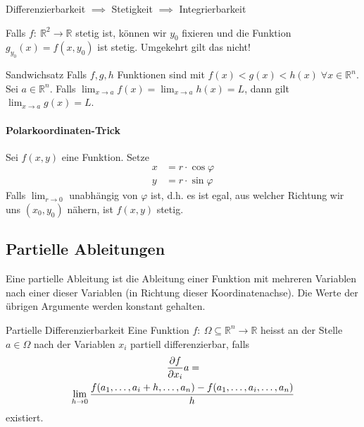 \documentclass[a4paper,10pt]{article}
\def\R{\mathbb{R}}
\begin{document}
\begin{subbox}{}
    Differenzierbarkeit \( \implies \) Stetigkeit \( \implies \) Integrierbarkeit
\end{subbox}

Falls \( f: \: \R^2 \to \R \) stetig ist, können wir \( y_0 \) fixieren und die Funktion \( g_{y_0}(x) = f(x, y_0) \) ist stetig. Umgekehrt gilt das nicht!

\begin{mainbox}{Sandwichsatz}
    Falls \( f, g, h \) Funktionen sind mit \( f(x) < g(x) < h(x) \; \forall x \in \R^n \). Sei \( a \in \R^n \). Falls \( \lim_{x \to a} f(x) = \lim_{x \to a} h(x) = L \), dann gilt \( \lim_{x \to a} g(x) = L \).
\end{mainbox}

\paragraph{Polarkoordinaten-Trick}
Sei \( f(x, y) \) eine Funktion. Setze \begin{align*}
    x &= r \cdot \cos \varphi \\
    y &= r \cdot \sin \varphi
\end{align*}
Falls \( \lim_{r \to 0} \) unabhängig von \( \varphi \) ist, d.h. es ist egal, aus welcher Richtung wir uns \( (x_0, y_0) \) nähern, ist \( f(x, y) \) stetig.


\subsection{Partielle Ableitungen}

\begin{mainbox}{}
    Eine partielle Ableitung ist die Ableitung einer Funktion mit mehreren Variablen nach einer dieser Variablen (in Richtung dieser Koordinatenachse). Die Werte der übrigen Argumente werden konstant gehalten.
\end{mainbox}

\begin{mainbox}{Partielle Differenzierbarkeit}
    Eine Funktion \( f: \: \Omega \subseteq \R^n \to \R \) heisst an der Stelle \( a \in \Omega \) nach der Variablen \( x_i \) partiell differenzierbar, falls \begin{multline*}
        \pdv{f}{x_i} a = \\
        \lim_{h \to 0} \frac{f(a_1, \dots, a_i + h, \dots, a_n) - f(a_1, \dots, a_i, \dots, a_n)}{h}
    \end{multline*} existiert.
\end{mainbox}
\end{document}
